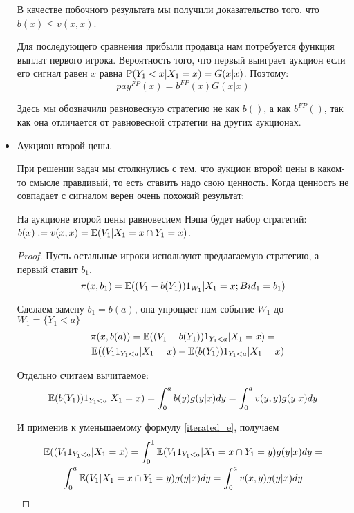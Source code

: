 \begin{itemize}
В качестве побочного результата мы получили доказательство того, что $ b(x)\leq v(x,x) $.

Для последующего сравнения прибыли продавца нам потребуется функция выплат первого игрока. Вероятность того, что первый выиграет аукцион если его сигнал равен $ x $ равна $ \P(Y_{1}<x|X_{1}=x)=G(x|x)$. Поэтому:
\begin{equation}
pay^{FP}(x)=b^{FP}(x)G(x|x)
\end{equation}

Здесь мы обозначили равновесную стратегию не как $ b() $, а как $ b^{FP}() $, так как она отличается от равновесной стратегии на других аукционах.

\item Аукцион второй цены.

При решении задач мы столкнулись с тем, что аукцион второй цены в каком-то смысле правдивый, то есть ставить надо свою ценность. Когда ценность не совпадает с сигналом верен очень похожий результат:

\begin{myth} \label{NE_SP}
На аукционе второй цены равновесием Нэша будет набор стратегий: $b(x):=v(x,x)=\E(V_{1}|X_{1}=x \cap Y_{1}=x)$.
\end{myth}
\begin{proof}
Пусть остальные игроки используют предлагаемую стратегию, а первый ставит $ b_{1} $.
\begin{equation}
\pi(x,b_{1})=\E((V_{1}-b(Y_{1}))1_{W_{1}}|X_{1}=x; Bid_{1}=b_{1})
\end{equation}

Сделаем замену $ b_{1}=b(a) $, она упрощает нам событие $ W_{1} $ до $ W_{1}=\{Y_{1}<a\} $
\begin{multline}
\pi(x,b(a))=\E((V_{1}-b(Y_{1}))1_{Y_{1}<a}|X_{1}=x)=\\
=\E((V_{1}1_{Y_{1}<a}|X_{1}=x)-\E(b(Y_{1}))1_{Y_{1}<a}|X_{1}=x)
\end{multline}

Отдельно считаем вычитаемое:
\begin{equation}
\E(b(Y_{1}))1_{Y_{1}<a}|X_{1}=x)=\int_{0}^{a}b(y)g(y|x)dy=\int_{0}^{a}v(y,y)g(y|x)dy
\end{equation}

И применив к уменьшаемому формулу \ref{iterated_e}, получаем
\begin{multline}
\E((V_{1}1_{Y_{1}<a}|X_{1}=x)=\int_{0}^{1}\E(V_{1}1_{Y_{1}<a}|X_{1}=x \cap Y_{1}=y)g(y|x)dy=\\
\int_{0}^{a}\E(V_{1}|X_{1}=x \cap Y_{1}=y)g(y|x)dy=\int_{0}^{a}v(x,y)g(y|x)dy
\end{multline}



\end{proof}
\end{itemize}
